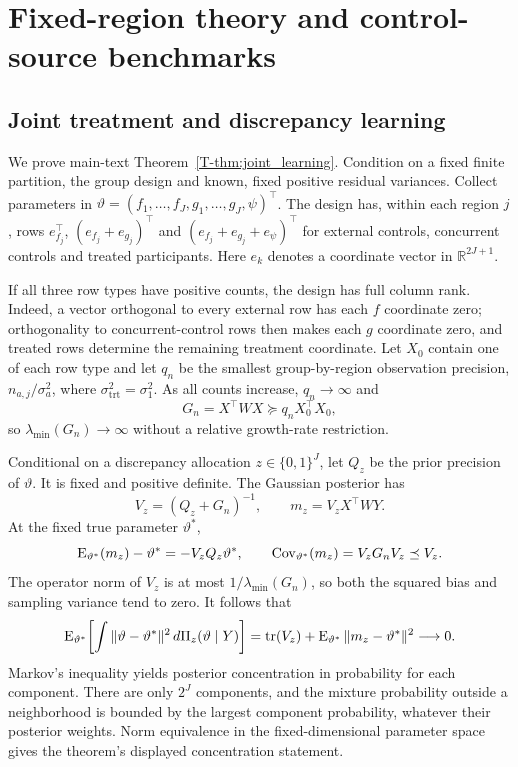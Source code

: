 \section{Fixed-region theory and control-source benchmarks}\label{sec:C}
\subsection{Joint treatment and discrepancy learning}\label{sec:C.joint}
We prove main-text Theorem~\ref{T-thm:joint_learning}. Condition on a fixed finite partition, the group design and known, fixed positive residual variances. Collect parameters in
$\vartheta=(f_1,\ldots,f_J,g_1,\ldots,g_J,\psi)^\top$.
The design has, within each region $j$, rows $e_{f_j}^\top$, $(e_{f_j}+e_{g_j})^\top$ and $(e_{f_j}+e_{g_j}+e_\psi)^\top$ for external controls, concurrent controls and treated participants. Here $e_k$ denotes a coordinate vector in $\mathbb R^{2J+1}$.

If all three row types have positive counts, the design has full column rank. Indeed, a vector orthogonal to every external row has each $f$ coordinate zero; orthogonality to concurrent-control rows then makes each $g$ coordinate zero, and treated rows determine the remaining treatment coordinate. Let $X_0$ contain one of each row type and let $q_n$ be the smallest group-by-region observation precision, $n_{a,j}/\sigma_a^2$, where $\sigma_{\mathrm{trt}}^2=\sigma_1^2$. As all counts increase, $q_n\to\infty$ and
\[
G_n=X^\top WX\succeq q_nX_0^\top X_0,
\]
so $\lambda_{\min}(G_n)\to\infty$ without a relative growth-rate restriction.

Conditional on a discrepancy allocation $z\in\{0,1\}^J$, let $Q_z$ be the prior precision of $\vartheta$. It is fixed and positive definite. The Gaussian posterior has
\[
V_z=(Q_z+G_n)^{-1},\qquad m_z=V_zX^\top WY.
\]
At the fixed true parameter $\vartheta^*$,
\[
\operatorname{E}_{\vartheta^*}(m_z)-\vartheta^*=-V_zQ_z\vartheta^*,\qquad
\operatorname{Cov}_{\vartheta^*}(m_z)=V_zG_nV_z\preceq V_z.
\]
The operator norm of $V_z$ is at most $1/\lambda_{\min}(G_n)$, so both the squared bias and sampling variance tend to zero. It follows that
\[
\operatorname{E}_{\vartheta^*}\!\left[\int\|\vartheta-\vartheta^*\|^2
\,d\Pi_z(\vartheta\mid Y)\right]
=\operatorname{tr}(V_z)+\operatorname{E}_{\vartheta^*}\|m_z-\vartheta^*\|^2\longrightarrow0.
\]
Markov's inequality yields posterior concentration in probability for each component. There are only $2^J$ components, and the mixture probability outside a neighborhood is bounded by the largest component probability, whatever their posterior weights. Norm equivalence in the fixed-dimensional parameter space gives the theorem's displayed concentration statement.

